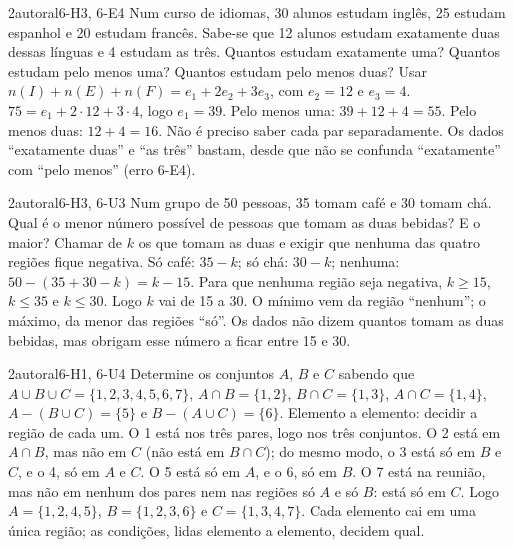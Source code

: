 \begin{exemplo}{}{2}{autoral}{6-H3, 6-E4}
\label{ex:u6:linguas}
Num curso de idiomas, 30 alunos estudam inglês, 25 estudam espanhol e 20 estudam francês. Sabe-se que 12 alunos estudam exatamente duas dessas línguas e 4 estudam as três. Quantos estudam exatamente uma? Quantos estudam pelo menos uma? Quantos estudam pelo menos duas?
\plano Usar $n(I)+n(E)+n(F)=e_1+2e_2+3e_3$, com $e_2=12$ e $e_3=4$.
\resolucao $75=e_1+2\cdot12+3\cdot4$, logo $e_1=39$. Pelo menos uma: $39+12+4=55$. Pelo menos duas: $12+4=16$.
\comentario Não é preciso saber cada par separadamente. Os dados \enquote{exatamente duas} e \enquote{as três} bastam, desde que não se confunda \enquote{exatamente} com \enquote{pelo menos} (erro 6-E4).
\end{exemplo}

\begin{exemplo}{}{2}{autoral}{6-H3, 6-U3}
\label{ex:u6:cafe}
Num grupo de 50 pessoas, 35 tomam café e 30 tomam chá. Qual é o menor número possível de pessoas que tomam as duas bebidas? E o maior?
\plano Chamar de $k$ os que tomam as duas e exigir que nenhuma das quatro regiões fique negativa.
\resolucao Só café: $35-k$; só chá: $30-k$; nenhuma: $50-(35+30-k)=k-15$. Para que nenhuma região seja negativa, $k\ge15$, $k\le35$ e $k\le30$. Logo $k$ vai de 15 a 30.
\comentario O mínimo vem da região \enquote{nenhum}; o máximo, da menor das regiões \enquote{só}. Os dados não dizem quantos tomam as duas bebidas, mas obrigam esse número a ficar entre 15 e 30.
\end{exemplo}

\begin{exemplo}{}{2}{autoral}{6-H1, 6-U4}
\label{ex:u6:elementos}
Determine os conjuntos $A$, $B$ e $C$ sabendo que $A\cup B\cup C=\{1,2,3,4,5,6,7\}$, $A\cap B=\{1,2\}$, $B\cap C=\{1,3\}$, $A\cap C=\{1,4\}$, $A-(B\cup C)=\{5\}$ e $B-(A\cup C)=\{6\}$.
\plano Elemento a elemento: decidir a região de cada um.
\resolucao O 1 está nos três pares, logo nos três conjuntos. O 2 está em $A\cap B$, mas não em $C$ (não está em $B\cap C$); do mesmo modo, o 3 está só em $B$ e $C$, e o 4, só em $A$ e $C$. O 5 está só em $A$, e o 6, só em $B$. O 7 está na reunião, mas não em nenhum dos pares nem nas regiões só $A$ e só $B$: está só em $C$. Logo $A=\{1,2,4,5\}$, $B=\{1,2,3,6\}$ e $C=\{1,3,4,7\}$.
\comentario Cada elemento cai em uma única região; as condições, lidas elemento a elemento, decidem qual.
\end{exemplo}

